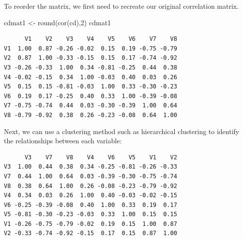 \documentclass[
  letterpaper,
  DIV=11,
  numbers=noendperiod]{scrreprt}
\newenvironment{Shaded}{\begin{snugshade}}{\end{snugshade}}
\newcommand{\DecValTok}[1]{\textcolor[rgb]{0.68,0.00,0.00}{#1}}
\newcommand{\FunctionTok}[1]{\textcolor[rgb]{0.28,0.35,0.67}{#1}}
\newcommand{\NormalTok}[1]{\textcolor[rgb]{0.00,0.23,0.31}{#1}}
\newcommand{\OtherTok}[1]{\textcolor[rgb]{0.00,0.23,0.31}{#1}}
\newcommand{\SpecialCharTok}[1]{\textcolor[rgb]{0.37,0.37,0.37}{#1}}
\begin{document}
To reorder the matrix, we first need to recreate our original
correlation matrix.

\begin{Shaded}
\begin{Highlighting}[]
\NormalTok{cdmat1 }\OtherTok{\textless{}{-}} \FunctionTok{round}\NormalTok{(}\FunctionTok{cor}\NormalTok{(cd),}\DecValTok{2}\NormalTok{)}
\NormalTok{cdmat1}
\end{Highlighting}
\end{Shaded}

\begin{verbatim}
      V1    V2    V3    V4    V5    V6    V7    V8
V1  1.00  0.87 -0.26 -0.02  0.15  0.19 -0.75 -0.79
V2  0.87  1.00 -0.33 -0.15  0.15  0.17 -0.74 -0.92
V3 -0.26 -0.33  1.00  0.34 -0.81 -0.25  0.44  0.38
V4 -0.02 -0.15  0.34  1.00 -0.03  0.40  0.03  0.26
V5  0.15  0.15 -0.81 -0.03  1.00  0.33 -0.30 -0.23
V6  0.19  0.17 -0.25  0.40  0.33  1.00 -0.39 -0.08
V7 -0.75 -0.74  0.44  0.03 -0.30 -0.39  1.00  0.64
V8 -0.79 -0.92  0.38  0.26 -0.23 -0.08  0.64  1.00
\end{verbatim}

Next, we can use a clustering method such as hierarchical clustering to
identify the relationships between each variable:

\begin{Shaded}
\end{Shaded}

\begin{verbatim}
      V3    V7    V8    V4    V6    V5    V1    V2
V3  1.00  0.44  0.38  0.34 -0.25 -0.81 -0.26 -0.33
V7  0.44  1.00  0.64  0.03 -0.39 -0.30 -0.75 -0.74
V8  0.38  0.64  1.00  0.26 -0.08 -0.23 -0.79 -0.92
V4  0.34  0.03  0.26  1.00  0.40 -0.03 -0.02 -0.15
V6 -0.25 -0.39 -0.08  0.40  1.00  0.33  0.19  0.17
V5 -0.81 -0.30 -0.23 -0.03  0.33  1.00  0.15  0.15
V1 -0.26 -0.75 -0.79 -0.02  0.19  0.15  1.00  0.87
V2 -0.33 -0.74 -0.92 -0.15  0.17  0.15  0.87  1.00
\end{verbatim}
\end{document}

